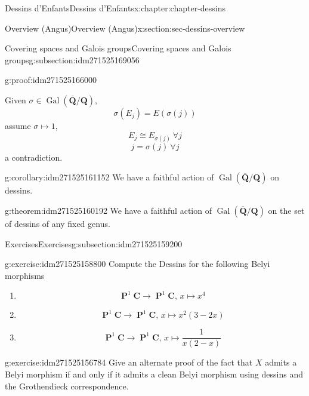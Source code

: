 \documentclass[oneside,10pt,]{book}
\numberwithin{equation}{section}
\newcommand{\QQ}{\mathbf{Q}}
\newcommand{\CC}{\mathbf{C}}
\newcommand{\absgal}[1]{\operatorname{Gal}(\overline{#1}/#1)}
\DeclareMathOperator{\PP}{\mathbf{P}}
\begin{document}
\begin{chapterptx}{Dessins d'Enfants}{}{Dessins d'Enfants}{}{}{x:chapter:chapter-dessins}
\begin{sectionptx}{Overview (Angus)}{}{Overview (Angus)}{}{}{x:section:sec-dessins-overview}
\begin{subsectionptx}{Covering spaces and Galois groups}{}{Covering spaces and Galois groups}{}{}{g:subsection:idm271525169056}
\begin{proofptx}{}{g:proof:idm271525166000}
\par
Given \(\sigma \in \absgal{\QQ}\),%
\begin{equation*}
\sigma(E_j) = E(\sigma(j))
\end{equation*}
assume \(\sigma \mapsto 1\),%
\begin{equation*}
E_j \cong E_{\sigma(j)}\ \forall j
\end{equation*}
%
\begin{equation*}
j = \sigma(j) \ \forall j
\end{equation*}
a contradiction.%
\end{proofptx}
\begin{corollary}{}{}{g:corollary:idm271525161152}%
We have a faithful action of \(\absgal{\QQ}\) on dessins.%
\end{corollary}
\begin{theorem}{}{}{g:theorem:idm271525160192}%
We have a faithful action of \(\absgal{\QQ}\) on the set of dessins of any fixed genus.%
\end{theorem}
\end{subsectionptx}
%
%
\typeout{************************************************}
\typeout{************************************************}
%
\begin{subsectionptx}{Exercises}{}{Exercises}{}{}{g:subsection:idm271525159200}
\begin{inlineexercise}{}{g:exercise:idm271525158800}%
Compute the Dessins for the following Belyi morphisms%
\begin{enumerate}
\item{}%
\begin{equation*}
\PP^1\CC\to \PP^1\CC,\,x\mapsto x^4
\end{equation*}
%
\item{}%
\begin{equation*}
\PP^1\CC\to \PP^1\CC,\,x\mapsto x^2(3-2x)
\end{equation*}
%
\item{}%
\begin{equation*}
\PP^1\CC\to \PP^1\CC,\,x\mapsto \frac{1}{x(2-x)}
\end{equation*}
%
\end{enumerate}
%
\end{inlineexercise}
\begin{inlineexercise}{}{g:exercise:idm271525156784}%
Give an alternate proof of the fact that \(X\) admits a Belyi morphism if and only if it admits a clean Belyi morphism using dessins and the Grothendieck correspondence.%

\end{inlineexercise}
\end{subsectionptx}
\end{sectionptx}
\end{chapterptx}
\end{document}
